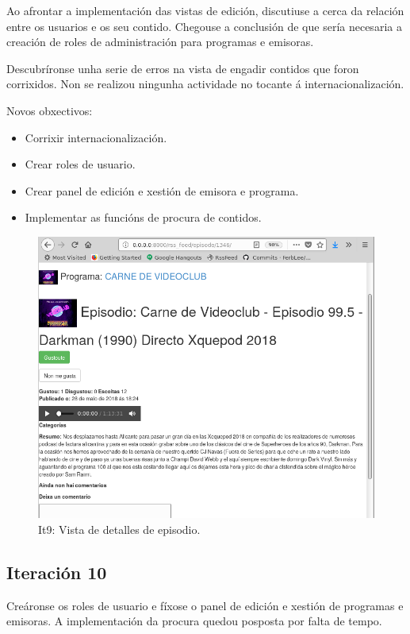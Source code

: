 Ao afrontar a implementación das vistas de edición, discutiuse a cerca da relación entre os usuarios e os seu contido. Chegouse a conclusión de que sería necesaria a creación de roles de administración para programas e emisoras.

Descubríronse unha serie de erros na vista de engadir contidos que foron corrixidos. Non se realizou ningunha actividade no tocante á internacionalización.

Novos obxectivos:
\begin{itemize}
	\item Corrixir internacionalización.
	\item Crear roles de usuario.
	\item Crear panel de edición e xestión de emisora e programa.
	\item Implementar as funcións de procura de contidos.
\end{itemize}

\begin{figure}[h]
	\centering
	\includegraphics[scale=0.5,keepaspectratio=true]{./images/episode_detail_final.png}
	\caption{It9: Vista de detalles de episodio.}
	\label{fig:episode_detail_final}
\end{figure}


\subsection{Iteración 10}

Creáronse os roles de usuario e fíxose o panel de edición e xestión de programas e emisoras. A implementación da procura quedou posposta por falta de tempo.

